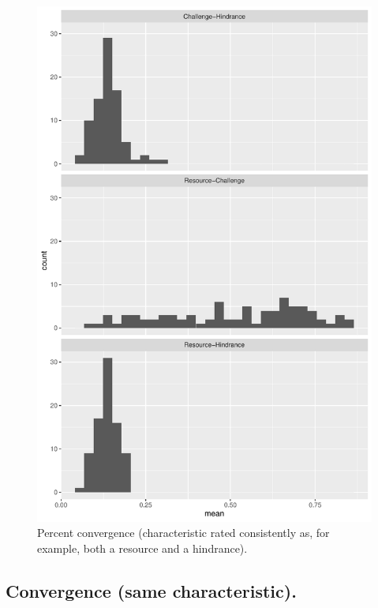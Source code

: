 \documentclass[
  man]{apa6}
\begin{document}
\begin{figure}
\centering
\includegraphics{copy-of-SIOP2023convergence_files/figure-latex/percagree-1.pdf}
\caption{\label{fig:percagree}Percent convergence (characteristic rated consistently as, for example, both a resource and a hindrance).}
\end{figure}

\hypertarget{convergence-same-characteristic.}{%
\subsection{Convergence (same characteristic).}\label{convergence-same-characteristic.}}
\end{document}
